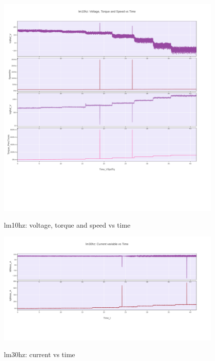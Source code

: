 \documentclass[paper=a4, fontsize=11pt]{scrartcl} %
\numberwithin{equation}{section} %
\numberwithin{figure}{section} %
\numberwithin{table}{section} %
\begin{document}
  \begin{figure}[H]
    \centering
      \href{https://plot.ly/~versag/32/#/}{\includegraphics[width=1\linewidth]{lm10hz_voltage_torque_speed_vs_time}}
        \caption{lm10hz: voltage, torque and speed vs time}
  \end{figure}

  \begin{figure}[H]
    \centering
      \href{https://plot.ly/~versag/34/#/}{\includegraphics[width=1\linewidth]{lm30hz_current_vs_time}}
        \caption{lm30hz: current vs time}
  \end{figure}
\end{document}
